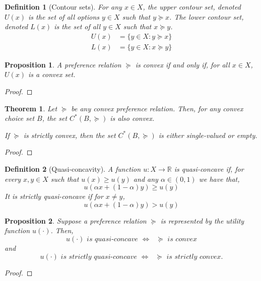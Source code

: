 \documentclass[12pt]{report}
\newtheorem{theorem}{Theorem}[chapter]
\newtheorem{definition}{Definition}[chapter]
\newtheorem{proposition}{Proposition}[chapter]
\begin{document}
\begin{definition}[Contour sets]
For any $x\in X$, the upper contour set, denoted $U(x)$ is the set of all options $y\in X$ such that $y\succeq x$. The lower contour set, denoted $L(x)$ is the set of all $y\in X$ such that $x\succeq y$. \begin{align*}
U(x) & = \{y\in X : y\succeq x\} \\
L(x) & = \{y\in X : x\succeq y\}
\end{align*}
\end{definition}

\begin{proposition}
A preference relation $\succeq$ is convex if and only if, for all $x\in X$, $U(x)$ is a convex set.
\end{proposition}

\begin{proof}

\end{proof}

\begin{theorem}
Let $\succeq$ be any convex preference relation. Then, for any convex choice set $B$, the set $C^*(B,\succeq)$ is also convex.

If $\succeq$ is strictly convex, then the set $C^*(B,\succeq)$ is either single-valued or empty.
\end{theorem}

\begin{proof}

\end{proof}

\begin{definition}[Quasi-concavity]
A function $u:X\to\mathbb{R}$ is quasi-concave if, for every $x,y\in X$ such that $u(x)\geq u(y)$ and any $\alpha\in(0,1)$ we have that, $$u(\alpha x + (1-\alpha) y)\geq u(y)$$It is strictly quasi-concave if for $x\neq y$, $$u(\alpha x + (1-\alpha) y)> u(y)$$
\end{definition}

\begin{proposition}
Suppose a preference relation $\succeq$ is represented by the utility function $u(\cdot)$. Then, $$u(\cdot)\textit{ is quasi-concave }\Leftrightarrow \textit{ }\succeq \textit{ is convex} $$ and $$u(\cdot)\textit{ is strictly quasi-concave }\Leftrightarrow \textit{ }\succeq \textit{ is strictly convex.} $$
\end{proposition}

\begin{proof}

\end{proof}
\end{document}
